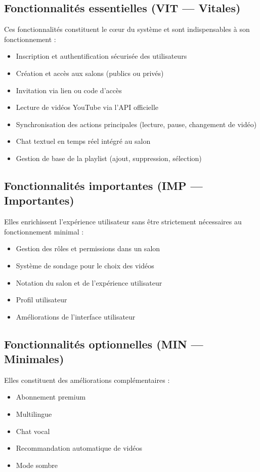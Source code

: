 \documentclass[12pt,a4paper]{report}
\begin{document}
\subsection*{Fonctionnalités essentielles (VIT — Vitales)}
Ces fonctionnalités constituent le cœur du système et sont indispensables à son fonctionnement :
\begin{itemize}
  \item Inscription et authentification sécurisée des utilisateurs
  \item Création et accès aux salons (publics ou privés)
  \item Invitation via lien ou code d’accès
  \item Lecture de vidéos YouTube via l’API officielle
  \item Synchronisation des actions principales (lecture, pause, changement de vidéo)
  \item Chat textuel en temps réel intégré au salon
  \item Gestion de base de la playlist (ajout, suppression, sélection)
\end{itemize}

\subsection*{Fonctionnalités importantes (IMP — Importantes)}
Elles enrichissent l’expérience utilisateur sans être strictement nécessaires au fonctionnement minimal :
\begin{itemize}
  \item Gestion des rôles et permissions dans un salon
  \item Système de sondage pour le choix des vidéos
  \item Notation du salon et de l’expérience utilisateur
  \item Profil utilisateur
  \item Améliorations de l’interface utilisateur
\end{itemize}

\subsection*{Fonctionnalités optionnelles (MIN — Minimales)}
Elles constituent des améliorations complémentaires :
\begin{itemize}
  \item Abonnement premium
  \item Multilingue
  \item Chat vocal
  \item Recommandation automatique de vidéos
  \item Mode sombre
\end{itemize}
\end{document}
